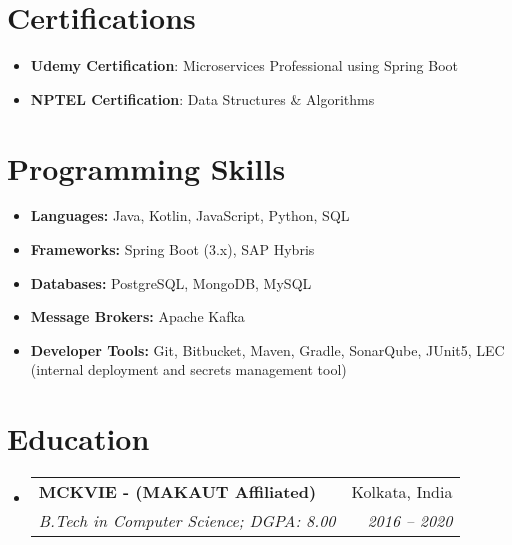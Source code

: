 \documentclass[letterpaper,11pt]{article}
\makeatletter
\newcommand{\resumeItem}[2]{
  \item\small{
    \textbf{#1}{: #2 \vspace{-2pt}}
  }
}
\newcommand{\resumeSubheading}[4]{
  \vspace{-1pt}\item
    \begin{tabular*}{0.97\textwidth}{l@{\extracolsep{\fill}}r}
      \textbf{#1} & #2 \\
      \textit{\small#3} & \textit{\small #4} \\
    \end{tabular*}\vspace{-5pt}
}
\newcommand{\resumeSubItem}[2]{\resumeItem{#1}{#2}\vspace{-4pt}}
\newcommand{\resumeSubHeadingListStart}{\begin{itemize}[leftmargin=*]}
\newcommand{\resumeSubHeadingListEnd}{\end{itemize}}
\makeatother
\begin{document}
\section{Certifications}
  \resumeSubHeadingListStart
    \resumeSubItem{Udemy Certification}
      {Microservices Professional using Spring Boot}
    \resumeSubItem{NPTEL Certification}
      {Data Structures \& Algorithms}
  \resumeSubHeadingListEnd

\section{Programming Skills}
 \begin{itemize}[leftmargin=*,nosep]
   \item \textbf{Languages:} Java, Kotlin, JavaScript, Python, SQL
   \item \textbf{Frameworks:} Spring Boot (3.x), SAP Hybris
   \item \textbf{Databases:} PostgreSQL, MongoDB, MySQL
   \item \textbf{Message Brokers:} Apache Kafka
   \item \textbf{Developer Tools:} Git, Bitbucket, Maven, Gradle, SonarQube, JUnit5, 
         LEC (internal deployment and secrets management tool)
 \end{itemize}


\section{Education}
  \resumeSubHeadingListStart
    \resumeSubheading
      {MCKVIE - (MAKAUT Affiliated)}{Kolkata, India}
      {B.Tech in Computer Science; DGPA: 8.00}{2016 -- 2020}
  \resumeSubHeadingListEnd

\end{document}
